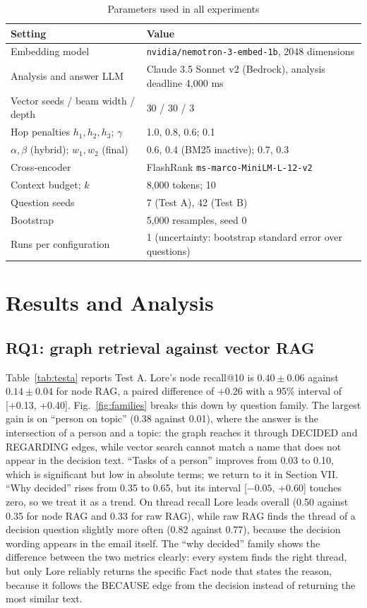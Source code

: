 \documentclass[12pt,onecolumn,draftclsnofoot]{IEEEtran}
\begin{document}
\begin{table}[t]
\centering
\caption{Parameters used in all experiments}
\label{tab:params}
\footnotesize
\begin{tabular}{@{}ll@{}}
\toprule
Setting & Value \\
\midrule
Embedding model & \texttt{nvidia/nemotron-3-embed-1b}, 2048 dimensions \\
Analysis and answer LLM & Claude 3.5 Sonnet v2 (Bedrock), analysis deadline 4,000 ms \\
Vector seeds / beam width / depth & 30 / 30 / 3 \\
Hop penalties $h_1,h_2,h_3$; $\gamma$ & 1.0, 0.8, 0.6; 0.1 \\
$\alpha, \beta$ (hybrid); $w_1, w_2$ (final) & 0.6, 0.4 (BM25 inactive); 0.7, 0.3 \\
Cross-encoder & FlashRank \texttt{ms-marco-MiniLM-L-12-v2} \\
Context budget; $k$ & 8,000 tokens; 10 \\
Question seeds & 7 (Test A), 42 (Test B) \\
Bootstrap & 5,000 resamples, seed 0 \\
Runs per configuration & 1 (uncertainty: bootstrap standard error over questions) \\
\bottomrule
\end{tabular}
\end{table}

\section{Results and Analysis}

\subsection{RQ1: graph retrieval against vector RAG}
Table~\ref{tab:testa} reports Test A. Lore's node recall@10 is $0.40 \pm 0.06$ against $0.14 \pm 0.04$ for node RAG, a paired difference of +0.26 with a 95\% interval of [+0.13, +0.40]. Fig.~\ref{fig:families} breaks this down by question family. The largest gain is on ``person on topic'' (0.38 against 0.01), where the answer is the intersection of a person and a topic: the graph reaches it through DECIDED and REGARDING edges, while vector search cannot match a name that does not appear in the decision text. ``Tasks of a person'' improves from 0.03 to 0.10, which is significant but low in absolute terms; we return to it in Section VII. ``Why decided'' rises from 0.35 to 0.65, but its interval [$-0.05$, +0.60] touches zero, so we treat it as a trend. On thread recall Lore leads overall (0.50 against 0.35 for node RAG and 0.33 for raw RAG), while raw RAG finds the thread of a decision question slightly more often (0.82 against 0.77), because the decision wording appears in the email itself. The ``why decided'' family shows the difference between the two metrics clearly: every system finds the right thread, but only Lore reliably returns the specific Fact node that states the reason, because it follows the BECAUSE edge from the decision instead of returning the most similar text.
\end{document}
